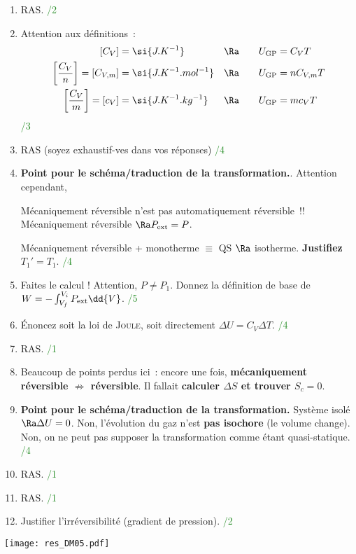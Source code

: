 \documentclass[a4paper, 10pt, final, garamond]{book}
\begin{document}
\begin{enumerate}
    \item RAS.
      \hfill \textcolor{ForestGreen}{/2}
    \item Attention aux définitions~:
      \[
              \begin{aligned}
              [C_V] &= \si{J.K^{-1}}
                    &
              \Ra
                    &
              \qquad
              U_{\rm GP} = C_V T
              \\
              \left[\frac{C_V}{n}\right] = [C_{V,m}] &= \si{J.K^{-1}.mol^{-1}}
                    &
              \Ra
                    &
              \qquad
              U_{\rm GP} = nC_{V,m} T
              \\
              \left[\frac{C_V}{m}\right] = [c_V] &= \si{J.K^{-1}.kg^{-1}}
                    &
              \Ra
                    &
              \qquad
              U_{\rm GP} = mc_V T
            \end{aligned}
      \]
      \hfill \textcolor{ForestGreen}{/3}
    \item RAS (soyez exhaustif-ves dans vos réponses)
      \hfill \textcolor{ForestGreen}{/4}
    \item \textbf{Point pour le schéma/traduction de la transformation.}.
      Attention cependant,
      \begin{center}
          \huge
          Mécaniquement réversible n'est pas automatiquement réversible~!!
          Mécaniquement réversible $\Ra P_{\rm ext} = P$.
      \end{center}
      Mécaniquement réversible + monotherme $\equiv$ QS $\Ra$ isotherme.
      \textbf{Justifiez $T_1' = T_1$}.
      \hfill \textcolor{ForestGreen}{/4}
    \item Faites le calcul ! Attention, {\Large $P \neq P_1$}. Donnez la
      définition de base de $W = -\int^{V_i}_{V_f}P_{\rm ext}\dd{V}$.
      \hfill \textcolor{ForestGreen}{/5}
    \item Énoncez soit la loi de \textsc{Joule}, soit directement $\Delta{U} =
      C_V \Delta{T}$.
      \hfill \textcolor{ForestGreen}{/4}
    \item RAS.
      \hfill \textcolor{ForestGreen}{/1}
    \item Beaucoup de points perdus ici~: encore une fois, \textbf{mécaniquement
      réversible $\nRightarrow$ réversible}. Il fallait \textbf{calculer
      $\Delta{S}$ et trouver $S_c = 0$}.
    \item \textbf{Point pour le schéma/traduction de la transformation.} Système
      isolé $\Ra \Delta{U} = 0$. Non, l'évolution du gaz n'est \textbf{pas
      isochore} (le volume change). Non, on ne peut pas supposer la
      transformation comme étant quasi-statique.
      \hfill \textcolor{ForestGreen}{/4}
    \item RAS.
      \hfill \textcolor{ForestGreen}{/1}
    \item RAS.
      \hfill \textcolor{ForestGreen}{/1}
    \item Justifier l'irréversibilité (gradient de pression).
      \hfill \textcolor{ForestGreen}{/2}
\end{enumerate}

\begin{center}
    \texttt{[image: res\_DM05.pdf]}
\end{center}
\end{document}
